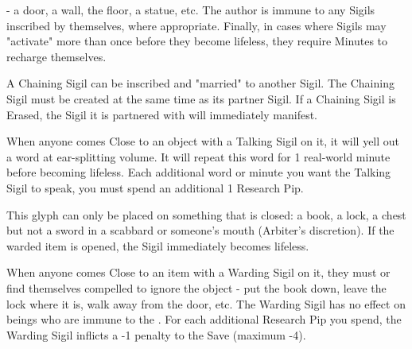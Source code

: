  - a door, a wall, the floor, a statue, etc.  The author is immune to any Sigils inscribed by themselves, where appropriate. Finally, in cases where Sigils may "activate" more than once before they become lifeless, they require Minutes to recharge themselves.


\cbreak






A Chaining Sigil can be inscribed and "married" to another Sigil.  The Chaining Sigil must be created at the same time as its partner Sigil.  If a Chaining Sigil is Erased, the Sigil it is partnered with will immediately manifest.



When anyone comes Close to an object with a Talking Sigil on it, it will yell out a word at ear-splitting volume.  It will repeat this word for 1 real-world minute before becoming lifeless.  Each additional word or minute you want the Talking Sigil to speak, you must spend an additional 1 Research Pip.


This glyph can only be placed on something that is closed: a book, a lock, a chest but not a sword in a scabbard or someone's mouth (Arbiter's discretion).  If the warded item is opened, the Sigil immediately becomes lifeless.

When anyone comes Close to an item with a Warding Sigil on it, they must  or find themselves compelled to ignore the object - put the book down, leave the lock where it is, walk away from the door, etc. The Warding Sigil has no effect on beings who are immune to the . For each additional Research Pip you spend, the Warding Sigil inflicts a -1 penalty to the Save (maximum -4).


